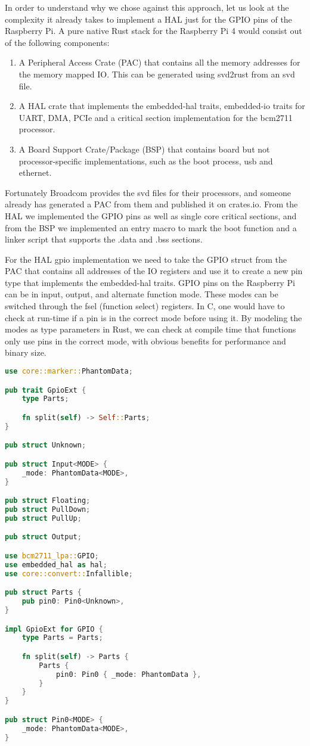 In order to understand why we chose against this approach, let us look at the complexity it already takes to implement a HAL just for the GPIO pins of the Raspberry Pi.
A pure native Rust stack for the Raspberry Pi 4 would consist out of the following components:
\begin{enumerate}
    \item A Peripheral Access Crate (PAC) that contains all the memory addresses for the memory mapped IO. This can be generated using svd2rust from an svd file.
    \item A HAL crate that implements the embedded-hal traits, embedded-io traits for UART, DMA, PCIe and a critical section implementation for the bcm2711 processor.
    \item A Board Support Crate/Package (BSP) that contains board but not processor-specific implementations, such as the boot process, usb and ethernet.
\end{enumerate}

Fortunately Broadcom provides the svd files for their processors, and someone already has generated a PAC from them and published it on crates.io.
From the HAL we implemented the GPIO pins as well as single core critical sections, and from the BSP we implemented an entry macro to mark the boot function and a linker script that supports the .data and .bss sections.

For the HAL gpio implementation we need to take the GPIO struct from the PAC that contains all addresses of the IO registers and use it to create a new pin type that implements the embedded-hal traits.
GPIO pins on the Raspberry Pi can be in input, output, and alternate function mode. These modes can be switched through the fsel (function select) registers.
In C, one would have to check at run-time if a pin is in the correct mode before using it.
By modeling the modes as type parameters in Rust, we can check at compile time that functions only use pins in the correct mode, with obvious benefits for performance and binary size.

\begin{lstlisting}[language=Rust,style=colouredRust]
use core::marker::PhantomData;

pub trait GpioExt {
    type Parts;

    fn split(self) -> Self::Parts;
}

pub struct Unknown;

pub struct Input<MODE> {
    _mode: PhantomData<MODE>,
}

pub struct Floating;
pub struct PullDown;
pub struct PullUp;

pub struct Output;

use bcm2711_lpa::GPIO;
use embedded_hal as hal;
use core::convert::Infallible;

pub struct Parts {
    pub pin0: Pin0<Unknown>,
}

impl GpioExt for GPIO {
    type Parts = Parts;

    fn split(self) -> Parts {
        Parts {
            pin0: Pin0 { _mode: PhantomData },
        }
    }
}

pub struct Pin0<MODE> {
    _mode: PhantomData<MODE>,
}
\end{lstlisting}

